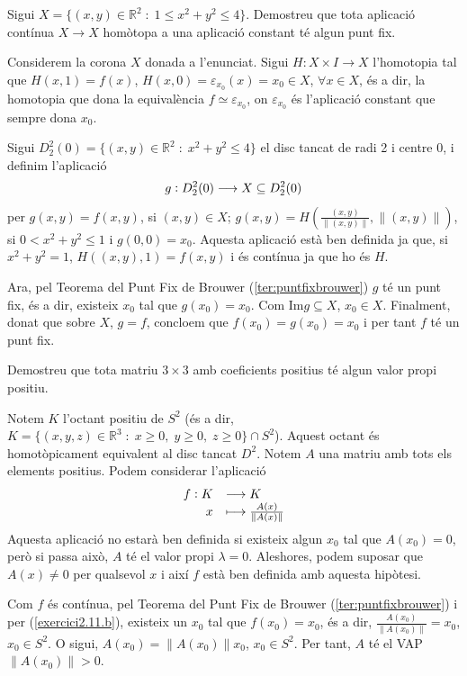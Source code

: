 \documentclass[../main.tex]{subfiles}
\begin{document}
\begin{exercici}
[Exercici 9]\label{exercici2.9} Sigui $X = \{(x,y)\in\mathbb{R}^2\;:\;1\leq x^2+y^2\leq 4\}$. Demostreu que tota aplicació contínua $X\rightarrow X$ homòtopa a una aplicació constant té algun punt fix.
\end{exercici}
\begin{sol}
Considerem la corona $X$ donada a l'enunciat. Sigui $H:X\times I\rightarrow X$ l'homotopia tal que $H(x,1) = f(x)$, $H(x,0) = \varepsilon_{x_0}(x) = x_0\in X$, $\forall x\in X$, és a dir, la homotopia que dona la equivalència $f\simeq \varepsilon_{x_0}$, on $\varepsilon_{x_0}$ és l'aplicació constant que sempre dona $x_0$.

Sigui $D^2_2(0) = \{(x,y)\in\mathbb{R}^2\;:\;x^2+y^2\leq 4\}$ el disc tancat de radi 2 i centre 0, i definim l'aplicació
\begin{equation}
    \notag
    g:D_2^2(0)\longrightarrow X\subseteq D_2^2(0)
\end{equation}
per $g(x,y) = f(x,y)$, si $(x,y)\in X$; $g(x,y) = H\left(\frac{(x,y)}{\|(x,y)\|},\|(x,y)\|\right)$, si $0<x^2+y^2\leq 1$ i $g(0,0)=x_0$. Aquesta aplicació està ben definida ja que, si $x^2+y^2=1$, $H((x,y),1)= f(x,y)$ i és contínua ja que ho és $H$.

Ara, pel Teorema del Punt Fix de Brouwer (\ref{ter:puntfixbrouwer}) $g$ té un punt fix, és a dir, existeix $x_0$ tal que $g(x_0) = x_0$. Com $\mathrm{Im}g\subseteq X$, $x_0\in X$. Finalment, donat que sobre $X$, $g=f$, concloem que $f(x_0) = g(x_0) = x_0$ i per tant $f$ té un punt fix.
\end{sol}


\begin{exercici}
[Exercici 10]\label{exercici2.10} Demostreu que tota matriu $3\times 3$ amb coeficients positius té algun valor propi positiu.
\end{exercici}
\begin{sol}
Notem $K$ l'octant positiu de $S^2$ (és a dir, $K = \{(x,y,z)\in\mathbb{R}^3\;:\;x\geq 0,\;y\geq 0,\;z\geq 0\}\cap S^2$). Aquest octant és homotòpicament equivalent al disc tancat $D^2$. Notem $A$ una matriu amb tots els elements positius. Podem considerar l'aplicació
\begin{equation}
    \notag
    \begin{array}{rl}
        f:K & \longrightarrow K \\
        x & \longmapsto \frac{A(x)}{\|A(x)\|}
    \end{array}
\end{equation}
Aquesta aplicació no estarà ben definida si existeix algun $x_0$ tal que $A(x_0)=0$, però si passa això, $A$ té el valor propi $\lambda = 0$. Aleshores, podem suposar que $A(x)\not=0$ per qualsevol $x$ i així $f$ està ben definida amb aquesta hipòtesi.

Com $f$ és contínua, pel Teorema del Punt Fix de Brouwer (\ref{ter:puntfixbrouwer}) i per (\ref{exercici2.11.b}), existeix un $x_0$ tal que $f(x_0) = x_0$, és a dir, $\frac{A(x_0)}{\|A(x_0)\|}=x_0$, $x_0\in S^2$. O sigui, $A(x_0)=\|A(x_0)\|x_0$, $x_0\in S^2$. Per tant, $A$ té el VAP $\|A(x_0)\|>0$.
\end{sol}
\end{document}
